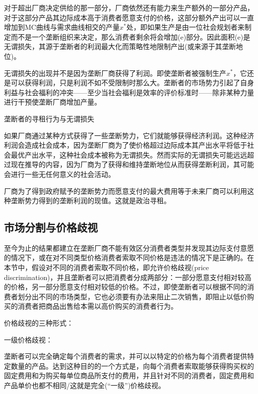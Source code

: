 \documentclass{article}
\begin{document}
\hspace*{\fill}

对于超出厂商决定供给的那一部分，厂商依然还有能力来生产额外的一部分产品，对于这部分产品其边际成本高于消费者愿意支付的价格，这部分额外产出可以一直增加到MC曲线与需求曲线相交的产量$ x^* $处，即如果生产是由一位社会规划者来制定而不是一个垄断组织来决定，那么消费者剩余将会增加(e)部分。因此面积(e)是无谓损失，其源于垄断者的利润最大化而策略性地限制产出(或来源于其垄断地位)。

无谓损失的出现并不是因为垄断厂商获得了利润。即使垄断者被强制生产$ x^* $，它还是可以获得利润，只是利润不如不受限制时那么大。垄断者的市场势力引起了自身利益与社会福利的冲突——至少当社会福利是效率的评价标准时——除非某种力量进行干预使垄断厂商增加产量。

垄断者的寻租行为与无谓损失

如果厂商通过某种方式获得了一些垄断势力，它们就能够获得经济利润。这种经济利润会造成社会成本，因为垄断厂商为了使价格超过边际成本其产出水平将低于社会最优产出水平，这种社会成本被称为无谓损失。然而实际的无谓损失可能远远超过现在推导的内容，因为厂商为了获得和维持垄断地位从而获得垄断利润，其可能会进行一些无任何意义的社会活动。

厂商为了得到政府赋予的垄断势力而愿意支付的最大费用等于未来厂商可以利用这种垄断势力得到的垄断利润的现值。这就是政治寻租。

\subsection{市场分割与价格歧视}

至今为止的结果都建立在垄断厂商不能有效区分消费者类型并发现其边际支付意愿的情况下，或在对不同类型价格消费者索取不同价格是违法的情况下是正确的。在本节中，假设对不同的消费者索取不同价格，即允许价格歧视(price discrimination)，并且垄断者可以把消费者分成两部分：一部分愿意支付相对较高的价格，另一部分愿意支付相对较低的价格。不过，即使垄断者可以根据不同的消费者划分出不同的市场类型，它也必须要有办法来阻止二次销售，即阻止以低价购买的消费者把商品出售给本需以高价购买的消费者行为。

\hspace*{\fill}

价格歧视的三种形式：

一级价格歧视：

垄断者可以完全确定每个消费者的需求，并可以以特定的价格为每个消费者提供特定数量的产品。达到这种目的的一个方式是，向每个消费者索取能够获得购买权的固定费用和为购买每单位商品所支付的费用，并且针对不同的消费者，固定费用和产品单价也都不相同/这就是完全(“一级”)价格歧视。
\end{document}
